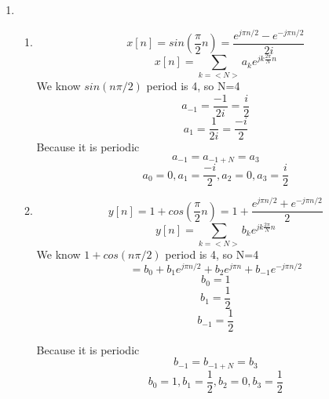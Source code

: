 \documentclass[10pt,a4paper, margin=1in]{article}
\begin{document}
\begin{enumerate}
\item %
    \begin{enumerate}
    \item %
    \begin{equation}
        x[n] = sin(\frac{\pi}{2}n) = \frac{e^{j\pi n/2} - e^{-j\pi n/2}}{2i}
    \end{equation}
    \begin{equation}
        x[n] = \sum_{k = <N>} a_ke^{jk\frac{2\pi}{N}n}
    \end{equation}
    We know $sin(n\pi/2) $ period is 4, so N=4
    \begin{equation}
        a_{-1} = \frac{-1}{2i} = \frac{i}{2}
    \end{equation}
    \begin{equation}
        a_{1} = \frac{1}{2i} = \frac{-i}{2}
    \end{equation}
    Because it is periodic
    \begin{equation}
        a_{-1} = a_{-1 + N} = a_3 
    \end{equation}
    \begin{equation}
        a_0 = 0, a_1 =  \frac{-i}{2}, a_2 =0,  a_3 = \frac{i}{2}
    \end{equation}
    \item %


    \begin{equation}
        y[n] =1 + cos(\frac{\pi}{2}n) = 1 + \frac{e^{j\pi n/2} + e^{-j\pi n/2}}{2}
    \end{equation}
    \begin{equation}
        y[n] = \sum_{k = <N>} b_ke^{jk\frac{2\pi}{N}n}
    \end{equation}
    We know $1 + cos(n\pi/2) $ period is 4, so N=4
    \begin{equation}
        = b_0 + b_1e^{j\pi n/2} + b_2e^{j\pi n} + b_{-1}e^{-j\pi n/2}
    \end{equation}
    \begin{equation}
        b_{0} = 1
    \end{equation}
    \begin{equation}
        b_{1} = \frac{1}{2}
    \end{equation}
    \begin{equation}
        b_{-1} = \frac{1}{2}
    \end{equation}

    Because it is periodic
    \begin{equation}
        b_{-1} = b_{-1 + N} = b_3 
    \end{equation}
    \begin{equation}
        b_0 = 1, b_1 =  \frac{1}{2}, b_2 =0,  b_3 = \frac{1}{2}
    \end{equation}


\end{enumerate}
\end{enumerate}
\end{document}
